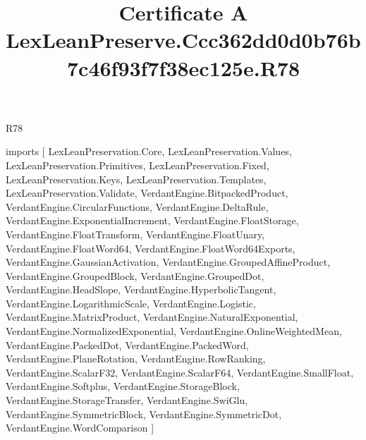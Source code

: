 \begin{lexlean}{R78}
\title{Certificate A LexLeanPreserve.Ccc362dd0d0b76b7c46f93f7f38ec125e.R78}
\begin{coremodule}
imports [
  LexLeanPreservation.Core,
  LexLeanPreservation.Values,
  LexLeanPreservation.Primitives,
  LexLeanPreservation.Fixed,
  LexLeanPreservation.Keys,
  LexLeanPreservation.Templates,
  LexLeanPreservation.Validate,
  VerdantEngine.BitpackedProduct,
  VerdantEngine.CircularFunctions,
  VerdantEngine.DeltaRule,
  VerdantEngine.ExponentialIncrement,
  VerdantEngine.FloatStorage,
  VerdantEngine.FloatTransform,
  VerdantEngine.FloatUnary,
  VerdantEngine.FloatWord64,
  VerdantEngine.FloatWord64Exports,
  VerdantEngine.GaussianActivation,
  VerdantEngine.GroupedAffineProduct,
  VerdantEngine.GroupedBlock,
  VerdantEngine.GroupedDot,
  VerdantEngine.HeadSlope,
  VerdantEngine.HyperbolicTangent,
  VerdantEngine.LogarithmicScale,
  VerdantEngine.Logistic,
  VerdantEngine.MatrixProduct,
  VerdantEngine.NaturalExponential,
  VerdantEngine.NormalizedExponential,
  VerdantEngine.OnlineWeightedMean,
  VerdantEngine.PackedDot,
  VerdantEngine.PackedWord,
  VerdantEngine.PlaneRotation,
  VerdantEngine.RowRanking,
  VerdantEngine.ScalarF32,
  VerdantEngine.ScalarF64,
  VerdantEngine.SmallFloat,
  VerdantEngine.Softplus,
  VerdantEngine.StorageBlock,
  VerdantEngine.StorageTransfer,
  VerdantEngine.SwiGlu,
  VerdantEngine.SymmetricBlock,
  VerdantEngine.SymmetricDot,
  VerdantEngine.WordComparison
]


\end{coremodule}
\end{lexlean}
